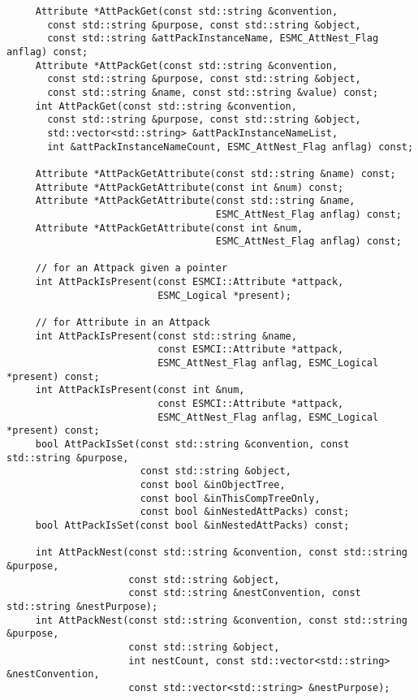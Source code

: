 \begin{verbatim}
     Attribute *AttPackGet(const std::string &convention,
       const std::string &purpose, const std::string &object,
       const std::string &attPackInstanceName, ESMC_AttNest_Flag anflag) const;
     Attribute *AttPackGet(const std::string &convention,
       const std::string &purpose, const std::string &object,
       const std::string &name, const std::string &value) const;
     int AttPackGet(const std::string &convention,
       const std::string &purpose, const std::string &object,
       std::vector<std::string> &attPackInstanceNameList,
       int &attPackInstanceNameCount, ESMC_AttNest_Flag anflag) const;
 
     Attribute *AttPackGetAttribute(const std::string &name) const;
     Attribute *AttPackGetAttribute(const int &num) const;
     Attribute *AttPackGetAttribute(const std::string &name,
                                    ESMC_AttNest_Flag anflag) const;
     Attribute *AttPackGetAttribute(const int &num,
                                    ESMC_AttNest_Flag anflag) const;
 
     // for an Attpack given a pointer
     int AttPackIsPresent(const ESMCI::Attribute *attpack,
                          ESMC_Logical *present);
 
     // for Attribute in an Attpack
     int AttPackIsPresent(const std::string &name,
                          const ESMCI::Attribute *attpack,
                          ESMC_AttNest_Flag anflag, ESMC_Logical *present) const;
     int AttPackIsPresent(const int &num,
                          const ESMCI::Attribute *attpack,
                          ESMC_AttNest_Flag anflag, ESMC_Logical *present) const;
     bool AttPackIsSet(const std::string &convention, const std::string &purpose,
                       const std::string &object,
                       const bool &inObjectTree,
                       const bool &inThisCompTreeOnly,
                       const bool &inNestedAttPacks) const;
     bool AttPackIsSet(const bool &inNestedAttPacks) const;
 
     int AttPackNest(const std::string &convention, const std::string &purpose,
                     const std::string &object,
                     const std::string &nestConvention, const std::string &nestPurpose);
     int AttPackNest(const std::string &convention, const std::string &purpose,
                     const std::string &object,
                     int nestCount, const std::vector<std::string> &nestConvention,
                     const std::vector<std::string> &nestPurpose);
 

\end{verbatim}
